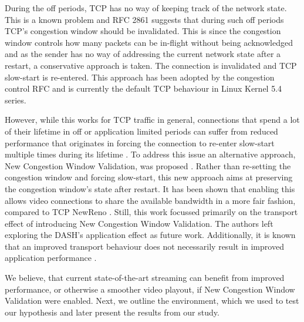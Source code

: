 \documentclass[10pt,sigconf]{acmart}
\begin{document}
During the off periods, TCP has no way of keeping track of the network state. This is a known problem and RFC 2861 \cite{rfc2861-2000-padhye-congestion-window-validation} suggests that during such off periods TCP's congestion window should be invalidated. This is since the congestion window controls how many packets can be in-flight without being acknowledged and as the sender has no way of addressing the current network state after a restart, a conservative approach is taken. The connection is invalidated and TCP slow-start is re-entered. This approach has been adopted by the congestion control RFC \cite{rfc5681-congeston-control} and is currently the default TCP behaviour in Linux Kernel 5.4 series.

However, while this works for TCP traffic in general, connections that spend a lot of their lifetime in off or application limited periods can suffer from reduced performance that originates in forcing the connection to re-enter slow-start multiple times during its lifetime \cite{Esteban-2012-Interactions-HTTP-TCP}. To address this issue an alternative approach, New Congestion Window Validation, was proposed \cite{rfc7661-2015-fairhurst-new-cwnd-validation}. Rather than re-setting the congestion window and forcing slow-start, this new approach aims at preserving the congestion window's state after restart. It has been shown that enabling this allows video connections to share the available bandwidth in a more fair fashion, compared to TCP NewReno \cite{Nazir-2014-performance-evaluation-congestion-window-validation-dash-newcwv}. Still, this work focussed primarily on the transport effect of introducing New Congestion Window Validation. The authors left exploring the DASH's application effect as future work. Additionally, it is known that an improved transport behaviour does not necessarily result in improved application performance \cite{Spiteri-2016-BOLA}.

We believe, that current state-of-the-art streaming can benefit from improved performance, or otherwise a smoother video playout, if New Congestion Window Validation were enabled. Next, we outline the environment, which we used to test our hypothesis and later present the results from our study.

\end{document}
